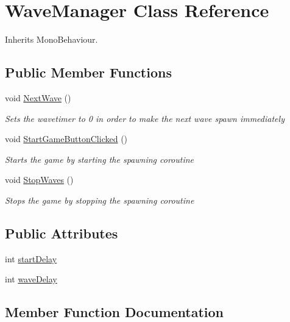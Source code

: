 \hypertarget{class_wave_manager}{}\section{Wave\+Manager Class Reference}
\label{class_wave_manager}


Inherits Mono\+Behaviour.

\subsection*{Public Member Functions}
\begin{DoxyCompactItemize}
\item 
void \hyperlink{class_wave_manager_a1b8b44f5b273a79cbe99f12429ab9278}{Next\+Wave} ()
\begin{DoxyCompactList}\small\item\em Sets the wavetimer to 0 in order to make the next wave spawn immediately \end{DoxyCompactList}\item 
void \hyperlink{class_wave_manager_a5f419cf2df0c693cb71122a0b43fc0ac}{Start\+Game\+Button\+Clicked} ()
\begin{DoxyCompactList}\small\item\em Starts the game by starting the spawning coroutine \end{DoxyCompactList}\item 
void \hyperlink{class_wave_manager_add21f68eb0c47ed4ad0ebd735193827d}{Stop\+Waves} ()
\begin{DoxyCompactList}\small\item\em Stops the game by stopping the spawning coroutine \end{DoxyCompactList}\end{DoxyCompactItemize}
\subsection*{Public Attributes}
\begin{DoxyCompactItemize}
\item 
int \hyperlink{class_wave_manager_a32df995055f87d3815f1c1e914408e2a}{start\+Delay}
\item 
int \hyperlink{class_wave_manager_a617dc857368276636bf84a66a5168a64}{wave\+Delay}
\end{DoxyCompactItemize}


\subsection{Member Function Documentation}
